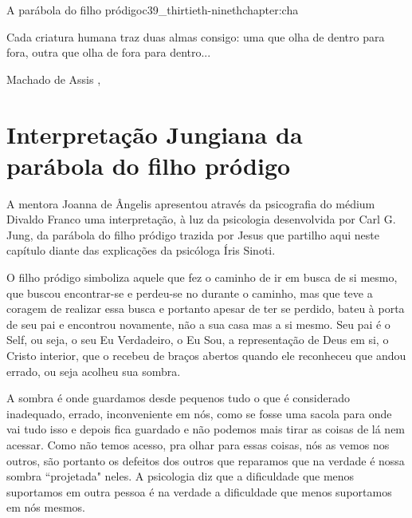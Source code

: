 \begin{chapterpage}{A parábola do filho pródigo}{c39_thirtieth-ninethchapter:cha}
 
\begin{myquotation}Cada criatura humana traz duas almas consigo: uma que olha de dentro para fora, outra que olha de fora para dentro... 
\par\vspace*{15mm}
\mbox{}\hfill \emdash{}Machado de Assis
, %
\par\end{myquotation}

\end{chapterpage}



\section{Interpretação Jungiana da parábola do filho pródigo}\label{c1_basicformatting:sec}

\emdash{}A mentora Joanna de Ângelis apresentou através da psicografia do médium Divaldo Franco uma interpretação, à luz da psicologia desenvolvida por Carl G. Jung, da parábola do filho pródigo trazida por Jesus que partilho aqui neste capítulo diante das explicações da psicóloga Íris Sinoti.

\emdash{}O filho pródigo simboliza aquele que fez o caminho de ir em busca de si mesmo, que buscou encontrar-se e perdeu-se no durante o caminho, mas que teve a coragem de realizar essa busca e portanto apesar de ter se perdido, bateu à porta de seu pai e encontrou novamente, não a sua casa mas a si mesmo. Seu pai é o Self, ou seja, o seu Eu Verdadeiro, o Eu Sou, a representação de Deus em si, o Cristo interior, que o recebeu de braços abertos quando ele reconheceu que andou errado, ou seja acolheu sua sombra.

\emdash{}A sombra é onde guardamos desde pequenos tudo o que é considerado inadequado, errado, inconveniente em nós, como se fosse uma sacola para onde vai tudo isso e depois fica guardado e não podemos mais tirar as coisas de lá nem acessar. Como não temos acesso, pra olhar para essas coisas, nós as vemos nos outros, são portanto os defeitos dos outros que reparamos que na verdade é nossa sombra ``projetada" neles. A psicologia diz que a dificuldade que menos suportamos em outra pessoa é na verdade a dificuldade que menos suportamos em nós mesmos.

